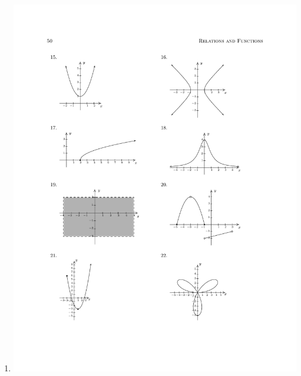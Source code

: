 \documentclass{ximera}
\begin{document}
\begin{exercise}
\begin{enumerate}
\item{\includegraphics{WiaFgraphs1-5.pdf}}
\end{enumerate}


\begin{selectAll}
\end{selectAll}

\end{exercise}
\end{document}
